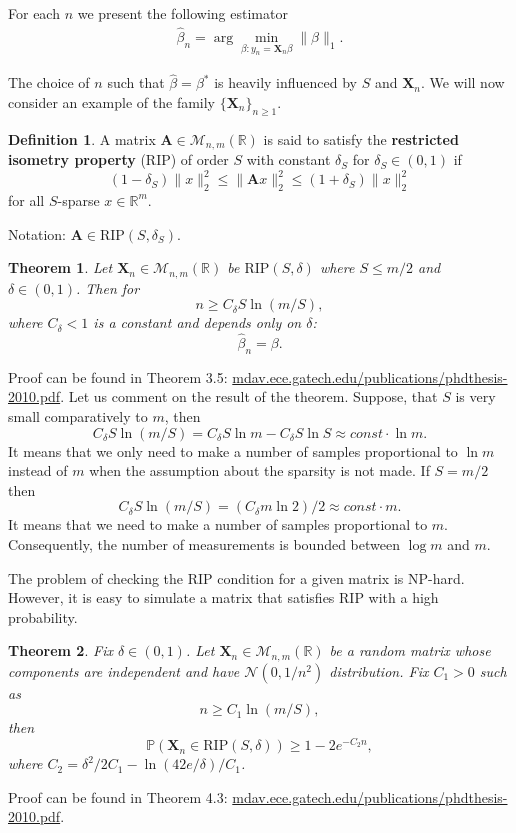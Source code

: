 \documentclass[11pt]{article}
\numberwithin{equation}{section}
\newtheorem{theorem}{Theorem}[section]
\theoremstyle{definition}
\newtheorem{definition}{Definition}[section]
\begin{document}
For each $n$ we present the following estimator
\begin{gather}
    \label{eq:noiselessBeta}
    \hat \beta_n = \arg \min_{\beta: y_n = \mathbf X_n \beta} \|\beta\|_1.
\end{gather}

The choice of $n$ such that $\hat \beta = \beta^*$ is heavily influenced by $S$ and $\mathbf X_n$.
We will now consider an example of the family $\{\mathbf X_n\}_{n \geqslant 1}$.

\begin{definition}
    \label{def:rip}
    A matrix $\mathbf A \in \mathcal M_{n, m}(\mathbb R)$ is said to satisfy the \textbf{restricted isometry property} (RIP) of order $S$ with constant $\delta_S$ for $\delta_S \in (0, 1)$ if
    $$ (1 - \delta_S) \|x\|_2^2 \leqslant \|\mathbf A x\|_2^2 \leqslant (1 + \delta_S) \|x\|_2^2 $$
    for all $S$-sparse $x \in \mathbb R^m$.
    
    Notation: $\mathbf A \in \textrm{RIP}(S, \delta_S)$.
\end{definition}

\begin{theorem}
    \label{theorem:CSforRIP}
    Let $\mathbf X_n \in \mathcal M_{n, m} (\mathbb R)$ be $\textrm{RIP}(S, \delta)$ where $S \leq m / 2$ and $\delta \in (0, 1)$. Then for
    $$ n \geqslant C_\delta S \ln(m / S), $$
    where $C_\delta < 1$ is a constant and depends only on $\delta$:
    $$ \hat \beta_n = \beta. $$
\end{theorem}
Proof can be found in Theorem 3.5: \url{mdav.ece.gatech.edu/publications/phdthesis-2010.pdf}.
Let us comment on the result of the theorem.
Suppose, that $S$ is very small comparatively to $m$, then
$$ C_\delta S \ln(m / S) = C_\delta S \ln m - C_\delta S \ln S \approx const \cdot \ln m. $$
It means that we only need to make a number of samples proportional to $\ln m$ instead of $m$ when the assumption about the sparsity is not made.
If $S = m / 2$ then
$$ C_\delta S \ln(m / S) = (C_\delta m \ln 2) / 2 \approx const \cdot m. $$
It means that we need to make a number of samples proportional to $m$.
Consequently, the number of measurements is bounded between $\log m$ and $m$.

The problem of checking the RIP condition for a given matrix is NP-hard.
However, it is easy to simulate a matrix that satisfies RIP with a high probability.

\begin{theorem}
    Fix $\delta \in (0, 1)$.
    Let $\mathbf X_n \in \mathcal M_{n, m} (\mathbb R)$ be a random matrix whose components are independent and have $\mathcal N(0, 1/n^2)$ distribution.
    Fix $C_1 > 0$ such as
    $$ n \geqslant C_1 \ln(m / S), $$
    then 
    $$ \mathbb P(\mathbf X_n \in \textrm{RIP}(S, \delta)) \geq 1 - 2 e^{-C_2 n}, $$
    where $C_2 = \delta^2/2C_1 - \ln (42 e / \delta) / C_1$.
\end{theorem}
Proof can be found in Theorem 4.3: \url{mdav.ece.gatech.edu/publications/phdthesis-2010.pdf}.
\end{document}
